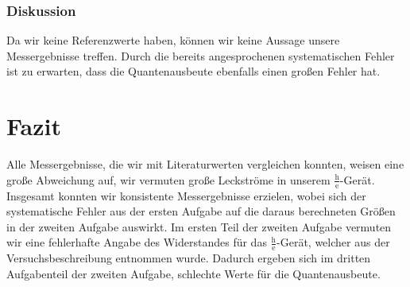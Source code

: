 \documentclass[12px]{scrartcl}
\begin{document}
\subsubsection{Diskussion}
Da wir keine Referenzwerte haben, können wir keine Aussage unsere Messergebnisse treffen. Durch die bereits angesprochenen systematischen Fehler ist zu erwarten, dass die Quantenausbeute ebenfalls einen großen Fehler hat.

\section{Fazit}
Alle Messergebnisse, die wir mit Literaturwerten vergleichen konnten, weisen eine große Abweichung auf, wir vermuten große Leckströme in unserem $\frac{\text{h}}{\text{e}}$-Gerät. Insgesamt konnten wir konsistente Messergebnisse erzielen, wobei sich der systematische Fehler aus der ersten Aufgabe auf die daraus berechneten Größen in der zweiten Aufgabe auswirkt. Im ersten Teil der zweiten Aufgabe vermuten wir eine fehlerhafte Angabe des Widerstandes für das $\frac{\text{h}}{\text{e}}$-Gerät, welcher aus der Versuchsbeschreibung entnommen wurde. Dadurch ergeben sich im dritten Aufgabenteil der zweiten Aufgabe, schlechte Werte für die Quantenausbeute.

\end{document}

